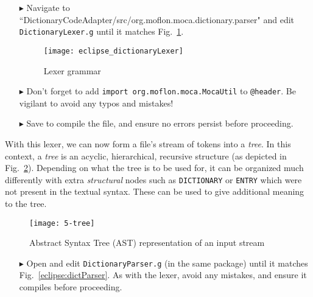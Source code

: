 \begin{itemize}
  
\item[$\blacktriangleright$] Navigate to ``Diction\-ary\-Code\-Adap\-ter/src/org.moflon.moca.dict\-ion\-ary\-.pars\-er" and edit \texttt{DictionaryLexer.g}
until it matches Fig.~\ref{eclipse:dictionaryLexer}. 


\newpage

\begin{figure}[!htbp]
\begin{center}
  \texttt{[image: eclipse\_dictionaryLexer]}
  \caption{Lexer grammar}
  \label{eclipse:dictionaryLexer}
\end{center}
\end{figure}

\item[$\blacktriangleright$] Don't forget to add \texttt{import org.moflon.moca.MocaUtil} to \texttt{@header}. Be vigilant to avoid any typos and mistakes!

\item[$\blacktriangleright$] Save to compile the file, and ensure no errors persist before proceeding.

\end{itemize}

With this lexer, we can now form a file's stream of tokens into a \emph{tree}. In this context, a \emph{tree} is an acyclic, hierarchical, recursive structure
(as depicted in Fig.~\ref{eclipse:dictLexer}). Depending on what the tree is to be used for, it can be organized much differently with extra \emph{structural}
nodes such as \texttt{DICTIONARY} or \texttt{ENTRY} which were not present in the textual syntax. These can be used to give additional meaning to the tree.

\begin{figure}[htp]
\begin{center}
 \texttt{[image: 5-tree]}
  \caption{Abstract Syntax Tree (AST) representation of an input stream}
  \label{eclipse:dictLexer}
\end{center}
\end{figure}

\begin{itemize}

\item[$\blacktriangleright$] Open and edit \texttt{DictionaryParser.g} (in the same package) until it matches Fig.~\ref{eclipse:dictParser}. As with
the lexer, avoid any mistakes, and ensure it compiles before proceeding.

\end{itemize}

